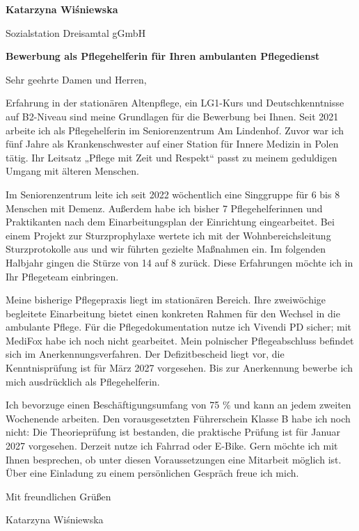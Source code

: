 \documentclass[11pt,a4paper]{article}
\begin{document}
{\large\bfseries\color{primarycolor} Katarzyna Wiśniewska}\par
Sozialstation Dreisamtal gGmbH\par
\textbf{Bewerbung als Pflegehelferin für Ihren ambulanten Pflegedienst}\par
Sehr geehrte Damen und Herren,

Erfahrung in der stationären Altenpflege, ein LG1-Kurs und Deutschkenntnisse auf B2-Niveau sind meine Grundlagen für die Bewerbung bei Ihnen. Seit 2021 arbeite ich als Pflegehelferin im Seniorenzentrum Am Lindenhof. Zuvor war ich fünf Jahre als Krankenschwester auf einer Station für Innere Medizin in Polen tätig. Ihr Leitsatz „Pflege mit Zeit und Respekt“ passt zu meinem geduldigen Umgang mit älteren Menschen.

Im Seniorenzentrum leite ich seit 2022 wöchentlich eine Singgruppe für 6 bis 8 Menschen mit Demenz. Außerdem habe ich bisher 7 Pflegehelferinnen und Praktikanten nach dem Einarbeitungsplan der Einrichtung eingearbeitet. Bei einem Projekt zur Sturzprophylaxe wertete ich mit der Wohnbereichsleitung Sturzprotokolle aus und wir führten gezielte Maßnahmen ein. Im folgenden Halbjahr gingen die Stürze von 14 auf 8 zurück. Diese Erfahrungen möchte ich in Ihr Pflegeteam einbringen.

Meine bisherige Pflegepraxis liegt im stationären Bereich. Ihre zweiwöchige begleitete Einarbeitung bietet einen konkreten Rahmen für den Wechsel in die ambulante Pflege. Für die Pflegedokumentation nutze ich Vivendi PD sicher; mit MediFox habe ich noch nicht gearbeitet. Mein polnischer Pflegeabschluss befindet sich im Anerkennungsverfahren. Der Defizitbescheid liegt vor, die Kenntnisprüfung ist für März 2027 vorgesehen. Bis zur Anerkennung bewerbe ich mich ausdrücklich als Pflegehelferin.

Ich bevorzuge einen Beschäftigungsumfang von 75 \% und kann an jedem zweiten Wochenende arbeiten. Den vorausgesetzten Führerschein Klasse B habe ich noch nicht: Die Theorieprüfung ist bestanden, die praktische Prüfung ist für Januar 2027 vorgesehen. Derzeit nutze ich Fahrrad oder E-Bike. Gern möchte ich mit Ihnen besprechen, ob unter diesen Voraussetzungen eine Mitarbeit möglich ist. Über eine Einladung zu einem persönlichen Gespräch freue ich mich.

Mit freundlichen Grüßen\par
Katarzyna Wiśniewska
\end{document}
